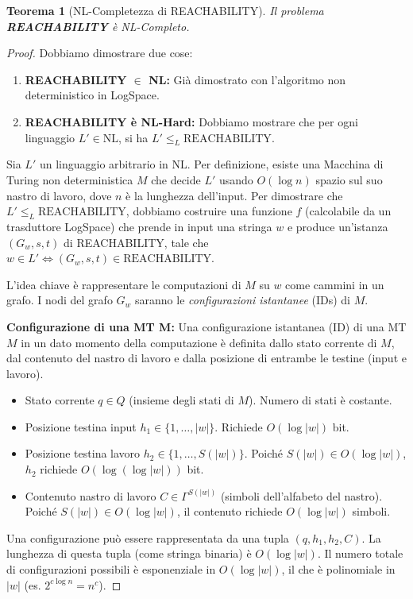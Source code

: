 \documentclass[a4paper, 11pt]{book} %
\newtheorem{theorem}{Teorema}[section]
\theoremstyle{definition}
\begin{document}
\begin{theorem}[NL-Completezza di REACHABILITY]
Il problema \textbf{REACHABILITY} è NL-Completo.
\end{theorem}
\begin{proof}
Dobbiamo dimostrare due cose:
\begin{enumerate}
    \item \textbf{REACHABILITY $\in$ NL:} Già dimostrato con l'algoritmo non deterministico in LogSpace.
    \item \textbf{REACHABILITY è NL-Hard:} Dobbiamo mostrare che per ogni linguaggio $L' \in \text{NL}$, si ha $L' \le_L \text{REACHABILITY}$.
\end{enumerate}

Sia $L'$ un linguaggio arbitrario in $\text{NL}$. Per definizione, esiste una Macchina di Turing non deterministica $M$ che decide $L'$ usando $O(\log n)$ spazio sul suo nastro di lavoro, dove $n$ è la lunghezza dell'input.
Per dimostrare che $L' \le_L \text{REACHABILITY}$, dobbiamo costruire una funzione $f$ (calcolabile da un trasduttore LogSpace) che prende in input una stringa $w$ e produce un'istanza $(G_w, s, t)$ di REACHABILITY, tale che $w \in L' \iff (G_w, s, t) \in \text{REACHABILITY}$.

L'idea chiave è rappresentare le computazioni di $M$ su $w$ come cammini in un grafo. I nodi del grafo $G_w$ saranno le \emph{configurazioni istantanee} (IDs) di $M$.

\textbf{Configurazione di una MT M:} Una configurazione istantanea (ID) di una MT $M$ in un dato momento della computazione è definita dallo stato corrente di $M$, dal contenuto del nastro di lavoro e dalla posizione di entrambe le testine (input e lavoro).
\begin{itemize}
    \item Stato corrente $q \in Q$ (insieme degli stati di $M$). Numero di stati è costante.
    \item Posizione testina input $h_1 \in \{1, \dots, |w|\}$. Richiede $O(\log |w|)$ bit.
    \item Posizione testina lavoro $h_2 \in \{1, \dots, S(|w|)\}$. Poiché $S(|w|) \in O(\log |w|)$, $h_2$ richiede $O(\log(\log |w|))$ bit.
    \item Contenuto nastro di lavoro $C \in \Gamma^{S(|w|)}$ (simboli dell'alfabeto del nastro). Poiché $S(|w|) \in O(\log |w|)$, il contenuto richiede $O(\log |w|)$ simboli.
\end{itemize}
Una configurazione può essere rappresentata da una tupla $(q, h_1, h_2, C)$. La lunghezza di questa tupla (come stringa binaria) è $O(\log |w|)$.
Il numero totale di configurazioni possibili è esponenziale in $O(\log |w|)$, il che è polinomiale in $|w|$ (es. $2^{c \log n} = n^c$).


\end{proof}
\end{document}
